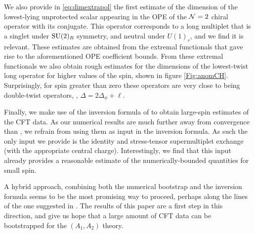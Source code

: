 We also provide in \eqref{eq:dimextrapol} the first estimate of the dimension of the lowest-lying unprotected scalar appearing in the  OPE of the ${\mathcal{N}}=2$ chiral operator with its conjugate. This operator corresponds to a long multiplet that is a singlet under $\mathrm{SU}(2)_R$ symmetry, and neutral under $U(1)_r$, and we find it is relevant.
These estimates are obtained from the extremal functionals \cite{ElShowk:2012hu} that gave rise to the aforementioned OPE coefficient bounds. From these extremal functionals we also obtain rough estimates for the dimensions of the lowest-twist long operator for higher values of the spin, shown in figure \ref{Fig:anomCH}. Surprisingly, for spin greater than zero these operators are very close to being double-twist operators, \ie, $\Delta = 2 \Delta_\phi + \ell$.

Finally, we make use of the inversion formula of \cite{Caron-Huot:2017vep} to obtain large-spin estimates of the CFT data. As our numerical results are much further away from convergence than \cite{Simmons-Duffin:2016wlq}, we refrain from using them as input in the inversion formula. As such the only input we provide is the identity and stress-tensor supermultiplet exchange (with the appropriate central charge). Interestingly, we find that this input already provides a reasonable estimate of the numerically-bounded quantities for small spin. 

A hybrid approach, combining both the numerical bootstrap and the inversion formula seems to be the most promising way to proceed, perhaps along the lines of the one suggested in \cite{Simmons-Duffin:2016wlq}. The results of this paper are a first step in this direction, and give us hope that a large amount of CFT data can be bootstrapped for the $(A_1,A_2)$ theory.
